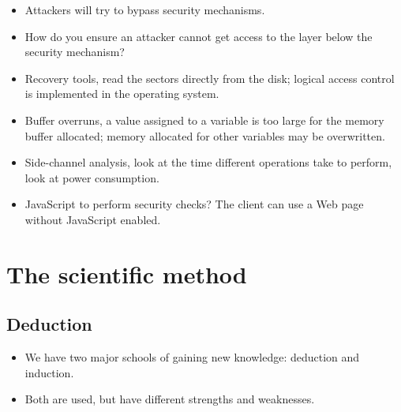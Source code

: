 \begin{frame}
  \begin{itemize}
    \item Attackers will try to bypass security mechanisms.

    \item How do you ensure an attacker cannot get access to the layer below 
      the security mechanism?
  \end{itemize}
\end{frame}

\begin{frame}
  \begin{itemize}
    \item Recovery tools, read the sectors directly from the disk; logical 
      access control is implemented in the operating system.

    \item Buffer overruns, a value assigned to a variable is too large for the 
      memory buffer allocated; memory allocated for other variables may be 
      overwritten.

    \item Side-channel analysis, look at the time different operations take to 
      perform, look at power consumption.

    \item JavaScript to perform security checks?
      The client can use a Web page without JavaScript enabled.

  \end{itemize}
\end{frame}


\section{The scientific method}

\subsection{Deduction}

\begin{frame}
  \begin{itemize}
    \item We have two major schools of gaining new knowledge: deduction and 
      induction.
    \item Both are used, but have different strengths and weaknesses.
  \end{itemize}
\end{frame}

